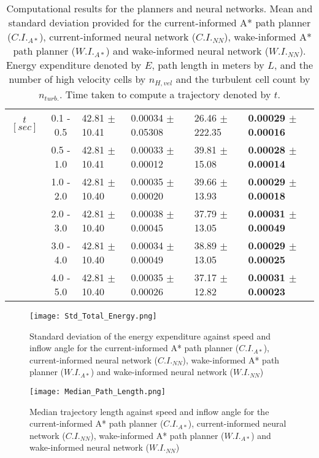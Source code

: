 \documentclass[final,5p,times,twocolumn]{elsarticle}
\begin{document}
\begin{table*}[!h]
\begin{tabular}{ c c | l l l l }
  $t$ $[sec]$   & 0.1 - 0.5 & 42.81 $\pm$ 10.41 & 0.00034 $\pm$ 0.05308 & 26.46 $\pm$ 222.35 & \textbf{0.00029 $\pm$ 0.00016} \\
                & 0.5 - 1.0 & 42.81 $\pm$ 10.41 & 0.00033 $\pm$ 0.00012 & 39.81 $\pm$ 15.08 & \textbf{0.00028 $\pm$ 0.00014} \\
                & 1.0 - 2.0 & 42.81 $\pm$ 10.40 & 0.00035 $\pm$ 0.00020 & 39.66 $\pm$ 13.93 & \textbf{0.00029 $\pm$ 0.00018} \\
                & 2.0 - 3.0 & 42.81 $\pm$ 10.40 & 0.00038 $\pm$ 0.00045 & 37.79 $\pm$ 13.05 & \textbf{0.00031 $\pm$ 0.00049} \\
                & 3.0 - 4.0 & 42.81 $\pm$ 10.40 & 0.00034 $\pm$ 0.00049 & 38.89 $\pm$ 13.05 & \textbf{0.00029 $\pm$ 0.00025} \\
                & 4.0 - 5.0 & 42.81 $\pm$ 10.40 & 0.00035 $\pm$ 0.00026 & 37.17 $\pm$ 12.82 & \textbf{0.00031 $\pm$ 0.00023} \\ \hline
  \hline
\end{tabular}
\caption{Computational results for the planners and neural networks. Mean and standard deviation provided for the current-informed A* path planner ($C.I._{A*}$), current-informed neural network ($C.I._{NN}$), wake-informed A* path planner ($W.I._{A*}$) and wake-informed neural network ($W.I._{NN}$). Energy expenditure denoted by $E$, path length in meters by $L$, and the number of high velocity cells by $n_{H,vel}$ and the turbulent cell count by $n_{turb.}$. Time taken to compute a trajectory denoted by $t$.}
\label{tab:ResultsTable}
\end{table*}

\begin{figure*}[!h]
    \centering
    \texttt{[image: Std\_Total\_Energy.png]}
    \caption{Standard deviation of the energy expenditure against speed and inflow angle for the current-informed A* path planner ($C.I._{A*}$), current-informed neural network ($C.I._{NN}$), wake-informed A* path planner ($W.I._{A*}$) and wake-informed neural network ($W.I._{NN}$) }
    \label{fig:std_energy}
\end{figure*}

\begin{figure*}[!h]
    \centering
    \texttt{[image: Median\_Path\_Length.png]}
    \caption{Median trajectory length against speed and inflow angle for the current-informed A* path planner ($C.I._{A*}$), current-informed neural network ($C.I._{NN}$), wake-informed A* path planner ($W.I._{A*}$) and wake-informed neural network ($W.I._{NN}$) }
    \label{fig:median_length}
\end{figure*}
\end{document}
